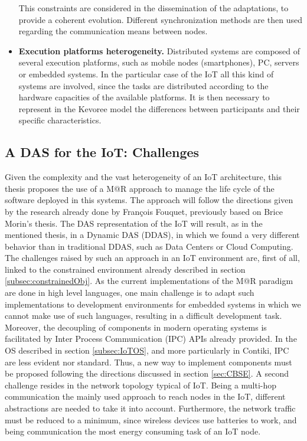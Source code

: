\begin{itemize}
	This constraints are considered in the dissemination of the adaptations, to provide a coherent evolution.
	Different synchronization methods are then used regarding the communication means between nodes.
	\item \textbf{Execution platforms heterogeneity.} Distributed systems are composed of several execution platforms, such as mobile nodes (smartphones), PC, servers or embedded systems. In the particular case of the IoT all this kind of systems are involved, since the tasks are distributed according to the hardware capacities of the available platforms.
	It is then necessary to represent in the Kevoree model the differences between participants and their specific characteristics.
\end{itemize}


\subsection{A DAS for the IoT: Challenges}
Given the complexity and the vast heterogeneity of an IoT architecture, this thesis proposes the use of a M@R approach to manage the life cycle of the software deployed in this systems.
The approach will follow the directions given by the research already done by Fran{\c{c}}ois Fouquet\cite{fouquet2013kevoree}, previously based on Brice Morin's thesis\cite{morin2010leveraging}.
The DAS representation of the IoT will result, as in the mentioned thesis, in a Dynamic DAS (DDAS), in which we found a very different behavior than in traditional DDAS, such as Data Centers or Cloud Computing.
The challenges raised by such an approach in an IoT environment are, first of all, linked to the constrained environment already described in section \ref{subsec:constrainedObj}.
As the current implementations of the M@R paradigm are done in high level languages, one main challenge is to adapt such implementations to development environments for embedded systems in which we cannot make use of such languages, resulting in a difficult development task.
Moreover, the decoupling of components in modern operating systems is facilitated by Inter Process Communication (IPC) APIs already provided.
In the OS described in section \ref{subsec:IoTOS}, and more particularly in Contiki, IPC are less evident nor standard.
Thus, a new way to implement components must be proposed following the directions discussed in section \ref{sec:CBSE}.
A second challenge resides in the network topology typical of IoT.
Being a multi-hop communication the mainly used approach to reach nodes in the IoT, different abstractions are needed to take it into account.
Furthermore, the network traffic must be reduced to a minimum, since wireless devices use batteries to work, and being communication the most energy consuming task of an IoT node.

